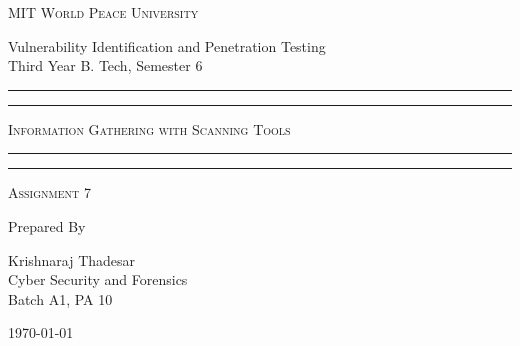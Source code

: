 \documentclass[11pt]{article}
\begin{document}
\begin{titlepage}
    \centering


    \huge\textsc{
        MIT World Peace University
    }\\

    \vspace{0.75\baselineskip} %

    \LARGE{
        Vulnerability Identification and Penetration Testing\\
        Third Year B. Tech, Semester 6
    }

    \vfill %


    \rule{\textwidth}{1.6pt}\vspace*{-\baselineskip}\vspace*{2pt}
    \rule{\textwidth}{0.6pt}
    \vspace{0.75\baselineskip} %



    \huge{\textsc{
            Information Gathering with Scanning Tools
        }} \\



    \vspace{0.5\baselineskip} %
    \rule{\textwidth}{0.6pt}\vspace*{-\baselineskip}\vspace*{2.8pt}
    \rule{\textwidth}{1.6pt}

    \vspace{1\baselineskip} %


    \LARGE\textsc{
        Assignment 7
    } %
    \vfill


    Prepared By
    \vspace{0.5\baselineskip} %

    \Large{
        Krishnaraj Thadesar \\
        Cyber Security and Forensics\\
        Batch A1, PA 10
    }


    \vspace{0.5\baselineskip} %
    \today

\end{titlepage}
\end{document}
